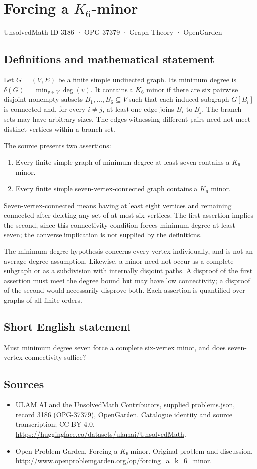 \documentclass[11pt,a4paper]{article}
\begin{document}
\section*{Forcing a $K_6$-minor}\label{3186}
{\small UnsolvedMath ID 3186 · OPG-37379 · Graph Theory · OpenGarden}
\subsection{Definitions and mathematical statement}
Let $G=(V,E)$ be a finite simple undirected graph. Its minimum degree is $\delta(G)=\min_{v\in V}\deg(v)$. It contains a $K_6$ minor if there are six pairwise disjoint nonempty subsets $B_1,\ldots,B_6\subseteq V$ such that each induced subgraph $G[B_i]$ is connected and, for every $i\ne j$, at least one edge joins $B_i$ to $B_j$. The branch sets may have arbitrary sizes. The edges witnessing different pairs need not meet distinct vertices within a branch set.

The source presents two assertions:
\begin{enumerate}
\item Every finite simple graph of minimum degree at least seven contains a $K_6$ minor.
\item Every finite simple seven-vertex-connected graph contains a $K_6$ minor.
\end{enumerate}
Seven-vertex-connected means having at least eight vertices and remaining connected after deleting any set of at most six vertices. The first assertion implies the second, since this connectivity condition forces minimum degree at least seven; the converse implication is not supplied by the definitions.

The minimum-degree hypothesis concerns every vertex individually, and is not an average-degree assumption. Likewise, a minor need not occur as a complete subgraph or as a subdivision with internally disjoint paths. A disproof of the first assertion must meet the degree bound but may have low connectivity; a disproof of the second would necessarily disprove both. Each assertion is quantified over graphs of all finite orders.
\subsection{Short English statement}
Must minimum degree seven force a complete six-vertex minor, and does seven-vertex-connectivity suffice?
\subsection{Sources}
\begin{itemize}
\item[S1] ULAM.AI and the UnsolvedMath Contributors, supplied problems.json, record 3186 (OPG-37379), OpenGarden. Catalogue identity and source transcription; CC BY 4.0.
\url{https://huggingface.co/datasets/ulamai/UnsolvedMath}.
\item[S2] Open Problem Garden, Forcing a $K_6$-minor. Original problem and discussion.
\url{http://www.openproblemgarden.org/op/forcing_a_k_6_minor}.
\end{itemize}
\end{document}
